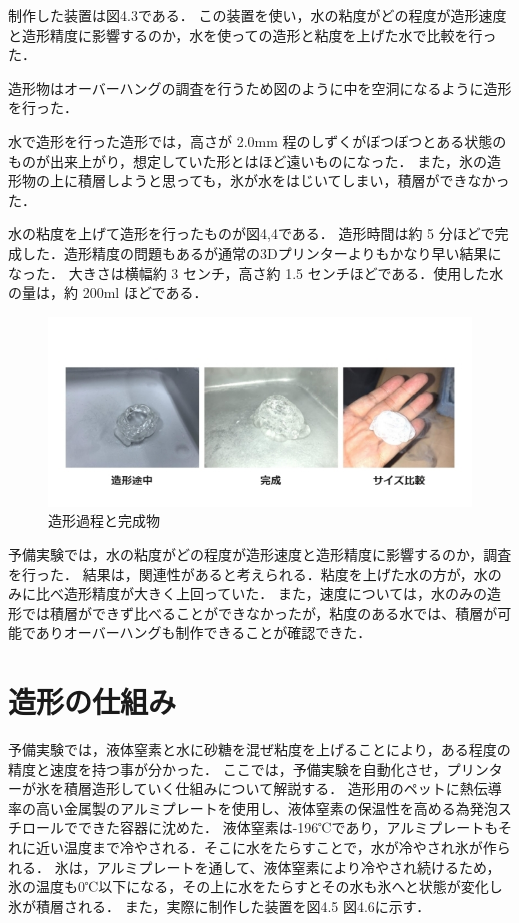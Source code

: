 制作した装置は図4.3である．
この装置を使い，水の粘度がどの程度が造形速度と造形精度に影響するのか，水を使っての造形と粘度を上げた水で比較を行った．

造形物はオーバーハングの調査を行うため図のように中を空洞になるように造形を行った． 

水で造形を行った造形では，高さが 2.0mm  程のしずくがぼつぼつとある状態のものが出来上がり，想定していた形とはほど遠いものになった．
また，氷の造形物の上に積層しようと思っても，氷が水をはじいてしまい，積層ができなかった．

水の粘度を上げて造形を行ったものが図4,4である．
造形時間は約 5 分ほどで完成した．造形精度の問題もあるが通常の3Dプリンターよりもかなり早い結果になった．
大きさは横幅約 3 センチ，高さ約 1.5 センチほどである．使用した水の量は，約 200ml ほどである．

\begin{figure}[H]
  \centering
  \includegraphics[width=15truecm]{./fig/yobi.jpg}
  \caption{造形過程と完成物}
  \label{fig:yobikekka}
\end{figure}

予備実験では，水の粘度がどの程度が造形速度と造形精度に影響するのか，調査を行った．
結果は，関連性があると考えられる．粘度を上げた水の方が，水のみに比べ造形精度が大きく上回っていた．
また，速度については，水のみの造形では積層ができず比べることができなかったが，粘度のある水では、積層が可能でありオーバーハングも制作できることが確認できた．

\section{造形の仕組み}
\label{sec:paragraph}
予備実験では，液体窒素と水に砂糖を混ぜ粘度を上げることにより，ある程度の精度と速度を持つ事が分かった．
ここでは，予備実験を自動化させ，プリンターが氷を積層造形していく仕組みについて解説する．
造形用のペットに熱伝導率の高い金属製のアルミプレートを使用し、液体窒素の保温性を高める為発泡スチロールでできた容器に沈めた．
液体窒素は-196℃であり，アルミプレートもそれに近い温度まで冷やされる．そこに水をたらすことで，水が冷やされ氷が作られる．
氷は，アルミプレートを通して、液体窒素により冷やされ続けるため，氷の温度も0℃以下になる，その上に水をたらすとその水も氷へと状態が変化し氷が積層される．
また，実際に制作した装置を図4.5 図4.6に示す．

